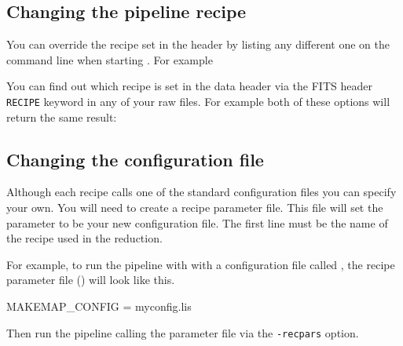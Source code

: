 \begin{terminalv}
\end{terminalv}



\subsection{Changing the pipeline recipe}
You can override the recipe set in the header by listing any different
one on the command line when starting \oracdr. For example
\begin{terminalv}
\end{terminalv}

You can find out which recipe is set in the data header via the FITS
header \texttt{RECIPE} keyword in any of your raw files.  For
example both of these options will return the same result:
\begin{terminalv}
\end{terminalv}

\subsection{Changing the configuration file}

Although each recipe calls one of the standard configuration files
you can specify your own. You will need to create a recipe parameter
file. This file will set the parameter  to be
your new configuration file. The first line must be the name of the
recipe used in the reduction.

For example, to run the pipeline with  with a
configuration file called , the recipe parameter file
() will look like this.
\vspace{0.2cm}
\begin{terminalv}
MAKEMAP_CONFIG = myconfig.lis
\end{terminalv}

Then run the pipeline calling the parameter file via the
\texttt{-recpars} option.
\begin{terminalv}
\end{terminalv}

